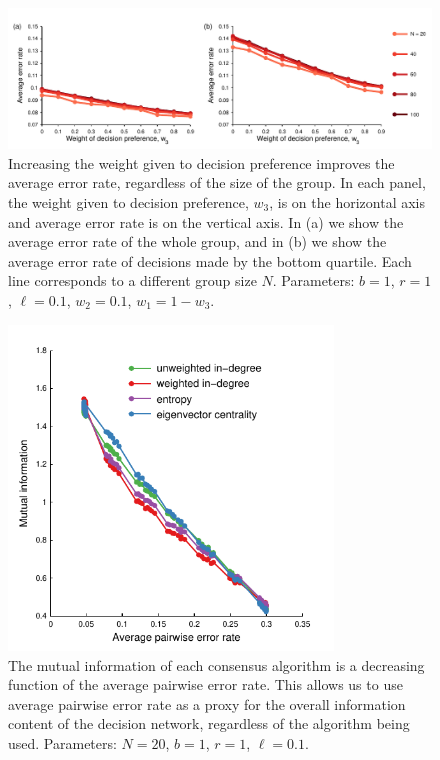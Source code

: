 \documentclass{article}
\begin{document}
\begin{figure}[ht]
\includegraphics[width=6.83in]{group_size.pdf}
\caption{\label{groupsize} Increasing the weight given to decision preference improves the average error rate, regardless of the size of the group.  In each panel, the weight given to decision preference, $w_3$, is on the horizontal axis and average error rate is on the vertical axis. In (a) we show the average error rate of the whole group, and in (b) we show the average error rate of decisions made by the bottom quartile. Each line corresponds to a different group size $N$. Parameters: $b=1$, $r=1$, $\ell=0.1$, $w_2=0.1$, $w_1=1-w_3$.}
\end{figure}

\begin{figure}[ht]
\includegraphics[width=3.4in]{mutinfo_vs_accuracy.pdf}
\caption{\label{mutinfo_vs_acc}  The mutual information of each consensus algorithm is a decreasing function of the average pairwise error rate.    This allows us to use average pairwise error rate as a proxy for the overall information content of the decision network, regardless of the algorithm being used. Parameters: $N=20$, $b=1$, $r=1$, $\ell=0.1$. }
\end{figure}
\end{document}
